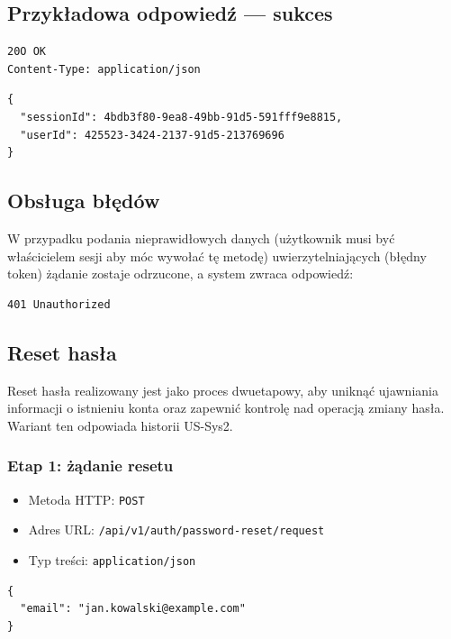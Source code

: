 \documentclass[11pt, a4paper]{article}
\begin{document}
\subsection{Przykładowa odpowiedź — sukces}

\begin{lstlisting}[style=http,caption={Odpowiedź HTTP — sukces}]
20O OK
Content-Type: application/json

\end{lstlisting}

\begin{lstlisting}[style=json,caption={Ciało odpowiedzi — sukces}]
{
  "sessionId": 4bdb3f80-9ea8-49bb-91d5-591fff9e8815,
  "userId": 425523-3424-2137-91d5-213769696
}
\end{lstlisting}

\subsection{Obsługa błędów}

W przypadku podania nieprawidłowych danych (użytkownik musi być właścicielem sesji aby móc wywołać tę metodę) uwierzytelniających (błędny token) żądanie zostaje odrzucone, a system zwraca odpowiedź:

\begin{lstlisting}[style=http,caption={Odpowiedź HTTP — błędna autoryzacja}]
401 Unauthorized
\end{lstlisting}
\subsection{Reset hasła}
Reset hasła realizowany jest jako proces dwuetapowy, aby uniknąć ujawniania informacji o istnieniu konta oraz zapewnić kontrolę nad operacją zmiany hasła.
Wariant ten odpowiada historii US-Sys2.

\subsubsection{Etap 1: żądanie resetu}
\begin{itemize}
    \item Metoda HTTP: \texttt{POST}
    \item Adres URL: \texttt{/api/v1/auth/password-reset/request}
    \item Typ treści: \texttt{application/json}
\end{itemize}

\begin{lstlisting}[style=json,caption={Ciało żądania — żądanie resetu hasła}]
{
  "email": "jan.kowalski@example.com"
}
\end{lstlisting}
\end{document}
